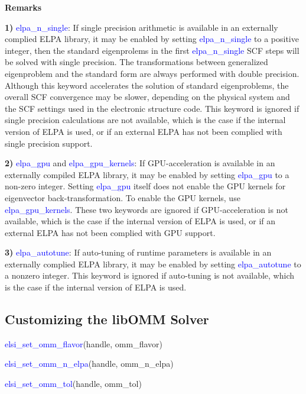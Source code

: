 \documentclass{report}
\begin{document}
\textbf{Remarks}

\textbf{1)} \textcolor{blue}{elpa\_n\_single}:  If single precision arithmetic is available in an externally complied ELPA library, it may be enabled by setting \textcolor{blue}{elpa\_n\_single} to a positive integer, then the standard eigenprolems in the first \textcolor{blue}{elpa\_n\_single} SCF steps will be solved with single precision.  The transformations between generalized eigenproblem and the standard form are always performed with double precision.  Although this keyword accelerates the solution of standard eigenproblems, the overall SCF convergence may be slower, depending on the physical system and the SCF settings used in the electronic structure code.  This keyword is ignored if single precision calculations are not available, which is the case if the internal version of ELPA is used, or if an external ELPA has not been complied with single precision support.

\textbf{2)} \textcolor{blue}{elpa\_gpu} and \textcolor{blue}{elpa\_gpu\_kernels}:  If GPU-acceleration is available in an externally compiled ELPA library, it may be enabled by setting \textcolor{blue}{elpa\_gpu} to a non-zero integer.  Setting \textcolor{blue}{elpa\_gpu} itself does not enable the GPU kernels for eigenvector back-transformation.  To enable the GPU kernels, use \textcolor{blue}{elpa\_gpu\_kernels}.  These two keywords are ignored if GPU-acceleration is not available, which is the case if the internal version of ELPA is used, or if an external ELPA has not been complied with GPU support.

\textbf{3)} \textcolor{blue}{elpa\_autotune}:  If auto-tuning of runtime parameters is available in an externally complied ELPA library, it may be enabled by setting \textcolor{blue}{elpa\_autotune} to a nonzero integer.  This keyword is ignored if auto-tuning is not available, which is the case if the internal version of ELPA is used.

\subsection{Customizing the libOMM Solver}
\label{subsec:setter_omm}
\begin{labeling}{\hspace{6cm}}
\item [\hspace{0.3cm} \textcolor{blue}{elsi\_set\_omm\_flavor}(handle, omm\_flavor)]
\item [\hspace{0.3cm} \textcolor{blue}{elsi\_set\_omm\_n\_elpa}(handle, omm\_n\_elpa)]
\item [\hspace{0.3cm} \textcolor{blue}{elsi\_set\_omm\_tol}(handle, omm\_tol)]
\end{labeling}
\end{document}
